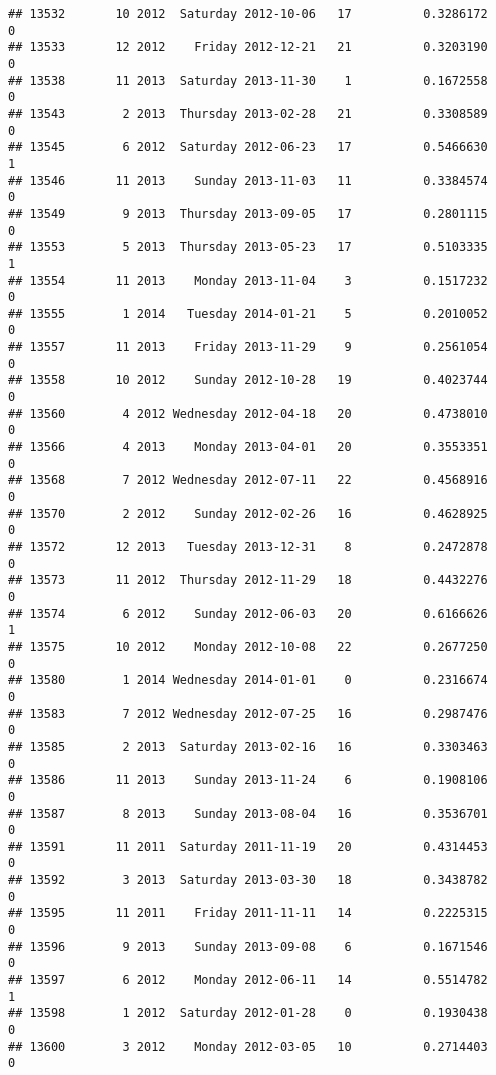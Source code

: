 \documentclass[
]{article}
\begin{document}
\begin{verbatim}
## 13532       10 2012  Saturday 2012-10-06   17          0.3286172             0
## 13533       12 2012    Friday 2012-12-21   21          0.3203190             0
## 13538       11 2013  Saturday 2013-11-30    1          0.1672558             0
## 13543        2 2013  Thursday 2013-02-28   21          0.3308589             0
## 13545        6 2012  Saturday 2012-06-23   17          0.5466630             1
## 13546       11 2013    Sunday 2013-11-03   11          0.3384574             0
## 13549        9 2013  Thursday 2013-09-05   17          0.2801115             0
## 13553        5 2013  Thursday 2013-05-23   17          0.5103335             1
## 13554       11 2013    Monday 2013-11-04    3          0.1517232             0
## 13555        1 2014   Tuesday 2014-01-21    5          0.2010052             0
## 13557       11 2013    Friday 2013-11-29    9          0.2561054             0
## 13558       10 2012    Sunday 2012-10-28   19          0.4023744             0
## 13560        4 2012 Wednesday 2012-04-18   20          0.4738010             0
## 13566        4 2013    Monday 2013-04-01   20          0.3553351             0
## 13568        7 2012 Wednesday 2012-07-11   22          0.4568916             0
## 13570        2 2012    Sunday 2012-02-26   16          0.4628925             0
## 13572       12 2013   Tuesday 2013-12-31    8          0.2472878             0
## 13573       11 2012  Thursday 2012-11-29   18          0.4432276             0
## 13574        6 2012    Sunday 2012-06-03   20          0.6166626             1
## 13575       10 2012    Monday 2012-10-08   22          0.2677250             0
## 13580        1 2014 Wednesday 2014-01-01    0          0.2316674             0
## 13583        7 2012 Wednesday 2012-07-25   16          0.2987476             0
## 13585        2 2013  Saturday 2013-02-16   16          0.3303463             0
## 13586       11 2013    Sunday 2013-11-24    6          0.1908106             0
## 13587        8 2013    Sunday 2013-08-04   16          0.3536701             0
## 13591       11 2011  Saturday 2011-11-19   20          0.4314453             0
## 13592        3 2013  Saturday 2013-03-30   18          0.3438782             0
## 13595       11 2011    Friday 2011-11-11   14          0.2225315             0
## 13596        9 2013    Sunday 2013-09-08    6          0.1671546             0
## 13597        6 2012    Monday 2012-06-11   14          0.5514782             1
## 13598        1 2012  Saturday 2012-01-28    0          0.1930438             0
## 13600        3 2012    Monday 2012-03-05   10          0.2714403             0

\end{verbatim}
\end{document}
